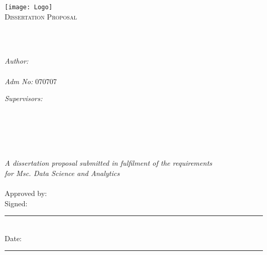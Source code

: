 \documentclass[
  11pt,
  oneside,
  english,
  singlespacing,
  headsepline,
]{MastersDoctoralThesis}
\author{\href{https://bonfacemunyoki.com}{Bonface Munyoki Kilyungi}}
\begin{document}
\frontmatter

\pagestyle{plain}

\begin{titlepage}
\begin{center}

\vspace*{.06\textheight}
\texttt{[image: Logo]}\\ %
\textsc{\Large Dissertation Proposal}\\[0.5cm] %

\HRule \\[0.4cm] %
{\huge \bfseries \ttitle\par}\vspace{0.4cm} %
\HRule \\[1.5cm] %

\begin{minipage}[t]{0.4\textwidth}
\begin{flushleft} \large
\emph{Author:}\\
\href{https://bonfacemunyoki.com}{\authorname} \\
\emph{Adm No:} 070707
\end{flushleft}
\end{minipage}
\begin{minipage}[t]{0.4\textwidth}
  \begin{flushright} \large
    \emph{Supervisors:} \\
    \supnamei\\
    \supnameii\\
    \supnameiii\\
    \supnameiv
\end{flushright}
\end{minipage}\\

\vfill

\large \textit{A dissertation proposal submitted in fulfilment of the
  requirements\\ for Msc. Data Science and Analytics}\\
\deptname\\[1cm] %

\noindent Approved by: \supnamei\\[1cm]
\noindent Signed:
\rule[0pt]{25em}{0.5pt}\\[1cm] %

\noindent Date:
\rule[0pt]{25em}{0.5pt} %


\end{center}

\end{titlepage}
\end{document}
